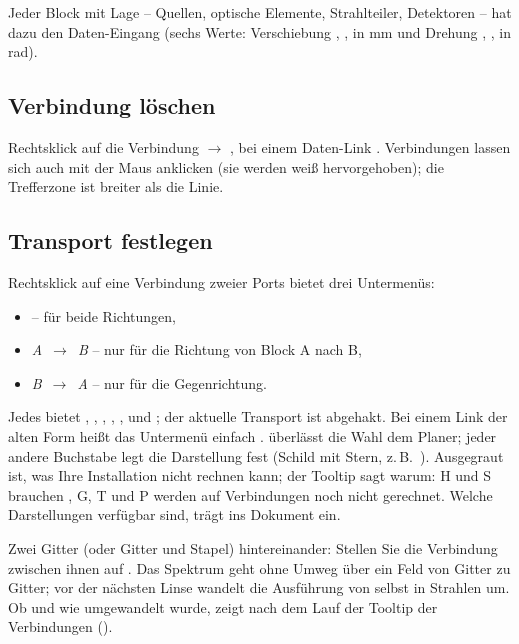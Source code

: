 Jeder Block mit Lage – Quellen, optische Elemente, Strahlteiler, Detektoren – hat dazu den
Daten-Eingang  (sechs Werte: Verschiebung , ,  in mm und
Drehung , ,  in rad).

\subsection{Verbindung löschen}

Rechtsklick auf die Verbindung $\to$ , bei einem Daten-Link
. Verbindungen lassen sich auch mit der Maus anklicken (sie werden weiß
hervorgehoben); die Trefferzone ist breiter als die Linie.

\subsection{Transport festlegen}\label{sec:workflow-transport}

Rechtsklick auf eine Verbindung zweier Ports bietet drei Untermenüs:

\begin{itemize}
  \item {} – für beide Richtungen,
  \item {} \textit{A}~$\to$~\textit{B} – nur für die Richtung von Block A nach B,
  \item {} \textit{B}~$\to$~\textit{A} – nur für die Gegenrichtung.
\end{itemize}

Jedes bietet , , , , ,  und ; der aktuelle Transport ist abgehakt. Bei einem
Link der alten Form heißt das Untermenü einfach .  überlässt die Wahl dem
Planer; jeder andere Buchstabe legt die Darstellung fest (Schild mit Stern, z.\,B.\ ).
Ausgegraut ist, was Ihre Installation nicht rechnen kann; der Tooltip sagt warum: H und S
brauchen , G, T und P werden auf Verbindungen noch nicht gerechnet. Welche
Darstellungen verfügbar sind, trägt  ins Dokument ein.

\begin{tipp}
Zwei Gitter (oder Gitter und Stapel) hintereinander: Stellen Sie die Verbindung zwischen ihnen
auf . Das Spektrum geht ohne Umweg über ein Feld von Gitter zu Gitter; vor der nächsten
Linse wandelt die Ausführung von selbst in Strahlen um. Ob und wie umgewandelt wurde, zeigt nach
dem Lauf der Tooltip der Verbindungen ().
\end{tipp}

